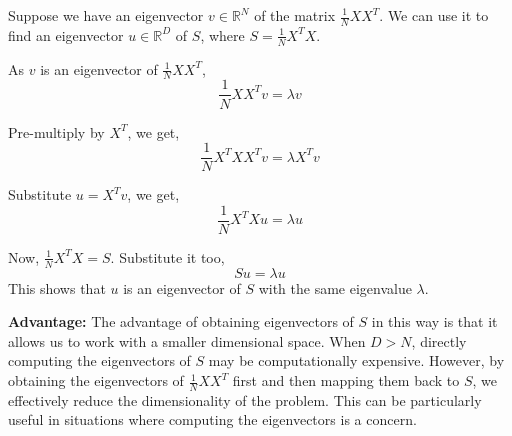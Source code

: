 \documentclass[a4paper,11pt]{article}
\begin{document}
\begin{mlsolution}
Suppose we have an eigenvector \(v \in \mathbb{R}^N\) of the matrix \(\frac{1}{N}XX^T\). We can use it to find an eigenvector \(u \in \mathbb{R}^D\) of \(S\), where \(S = \frac{1}{N}X^TX\).

As \(v\) is an eigenvector of \(\frac{1}{N}XX^T\),
\[
\frac{1}{N}XX^Tv = \lambda v
\]

Pre-multiply by \(X^T\), we get,
\[
\frac{1}{N}X^TXX^Tv = \lambda X^Tv
\]

Substitute \(u = X^Tv\), we get,
\[
\frac{1}{N}X^TXu = \lambda u
\]

Now, \(\frac{1}{N}X^TX = S\). Substitute it too,
\[
Su = \lambda u
\]
	This shows that \(u\) is an eigenvector of \(S\) with the same eigenvalue \(\lambda\).


\textbf{Advantage:} The advantage of obtaining eigenvectors of \(S\) in this way is that it allows us to work with a smaller dimensional space. When \(D > N\), directly computing the eigenvectors of \(S\) may be computationally expensive. However, by obtaining the eigenvectors of \(\frac{1}{N}XX^T\) first and then mapping them back to \(S\), we effectively reduce the dimensionality of the problem. This can be particularly useful in situations where computing the eigenvectors is a concern.

\end{mlsolution}
\end{document}
